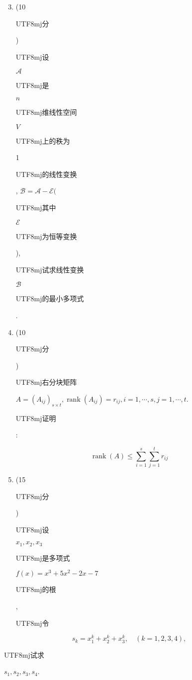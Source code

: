 \documentclass[10pt]{article}
\begin{document}
\begin{enumerate}
  \setcounter{enumi}{2}
  \item (10 \begin{CJK}{UTF8}{mj}分\end{CJK}) \begin{CJK}{UTF8}{mj}设\end{CJK} $\mathscr{A}$ \begin{CJK}{UTF8}{mj}是\end{CJK} $n$ \begin{CJK}{UTF8}{mj}维线性空间\end{CJK} $V$ \begin{CJK}{UTF8}{mj}上的秩为\end{CJK} 1 \begin{CJK}{UTF8}{mj}的线性变换\end{CJK}, $\mathscr{B}=\mathscr{A}-\mathscr{E}($ \begin{CJK}{UTF8}{mj}其中\end{CJK} $\mathscr{E}$ \begin{CJK}{UTF8}{mj}为恒等变换\end{CJK}), \begin{CJK}{UTF8}{mj}试求线性变换\end{CJK} $\mathscr{B}$ \begin{CJK}{UTF8}{mj}的最小多项式\end{CJK}.

  \item (10 \begin{CJK}{UTF8}{mj}分\end{CJK}) \begin{CJK}{UTF8}{mj}右分块矩阵\end{CJK} $A=\left(A_{i j}\right)_{s \times t}, \operatorname{rank}\left(A_{i j}\right)=r_{i j}, i=1, \cdots, s, j=1, \cdots, t$. \begin{CJK}{UTF8}{mj}证明\end{CJK}:

\end{enumerate}
$$
\operatorname{rank}(A) \leqslant \sum_{i=1}^{s} \sum_{j=1}^{t} r_{i j}
$$

\begin{enumerate}
  \setcounter{enumi}{4}
  \item (15 \begin{CJK}{UTF8}{mj}分\end{CJK}) \begin{CJK}{UTF8}{mj}设\end{CJK} $x_{1}, x_{2}, x_{3}$ \begin{CJK}{UTF8}{mj}是多项式\end{CJK} $f(x)=x^{3}+5 x^{2}-2 x-7$ \begin{CJK}{UTF8}{mj}的根\end{CJK}, \begin{CJK}{UTF8}{mj}令\end{CJK}
\end{enumerate}
$$
s_{k}=x_{1}^{k}+x_{2}^{k}+x_{3}^{k}, \quad(k=1,2,3,4),
$$
\begin{CJK}{UTF8}{mj}试求\end{CJK} $s_{1}, s_{2}, s_{3}, s_{4}$.
\end{document}
